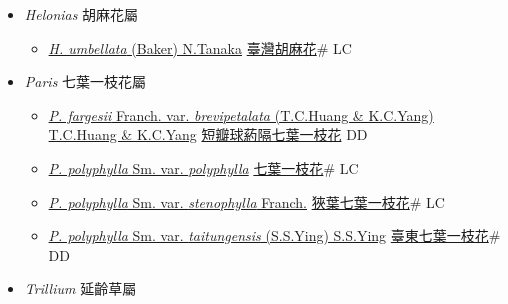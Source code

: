 
  \begin{itemize}
 \item[] \textit{Helonias} 胡麻花屬
                    
  \begin{itemize}
        \item[] \href{http://www.theplantlist.org/tpl1.1/search?q=Helonias+umbellata}{\textit{H. umbellata} (Baker) N.Tanaka}   \href{\detokenize{http://taibnet.sinica.edu.tw/chi/taibnet_species_list.php?T2=臺灣胡麻花&T2_new_value=true&fr=y}}{臺灣胡麻花}\# LC
  \end{itemize}
 \item[] \textit{Paris} 七葉一枝花屬
                    
  \begin{itemize}
        \item[] \href{http://www.theplantlist.org/tpl1.1/search?q=Paris+fargesii+var.+brevipetalata}{\textit{P. fargesii} Franch. var. \textit{brevipetalata} (T.C.Huang \& K.C.Yang) T.C.Huang \& K.C.Yang}   \href{\detokenize{http://taibnet.sinica.edu.tw/chi/taibnet_species_list.php?T2=短瓣球葯隔七葉一枝花&T2_new_value=true&fr=y}}{短瓣球葯隔七葉一枝花} DD
        \item[] \href{http://www.theplantlist.org/tpl1.1/search?q=Paris+polyphylla+var.+polyphylla}{\textit{P. polyphylla} Sm. var. \textit{polyphylla}}   \href{\detokenize{http://taibnet.sinica.edu.tw/chi/taibnet_species_list.php?T2=七葉一枝花&T2_new_value=true&fr=y}}{七葉一枝花}\# LC
        \item[] \href{http://www.theplantlist.org/tpl1.1/search?q=Paris+polyphylla+var.+stenophylla}{\textit{P. polyphylla} Sm. var. \textit{stenophylla} Franch.}   \href{\detokenize{http://taibnet.sinica.edu.tw/chi/taibnet_species_list.php?T2=狹葉七葉一枝花&T2_new_value=true&fr=y}}{狹葉七葉一枝花}\# LC
        \item[] \href{http://www.theplantlist.org/tpl1.1/search?q=Paris+polyphylla+var.+taitungensis}{\textit{P. polyphylla} Sm. var. \textit{taitungensis} (S.S.Ying) S.S.Ying}   \href{\detokenize{http://taibnet.sinica.edu.tw/chi/taibnet_species_list.php?T2=臺東七葉一枝花&T2_new_value=true&fr=y}}{臺東七葉一枝花}\# DD
  \end{itemize}
 \item[] \textit{Trillium} 延齡草屬
                    

\end{itemize}
